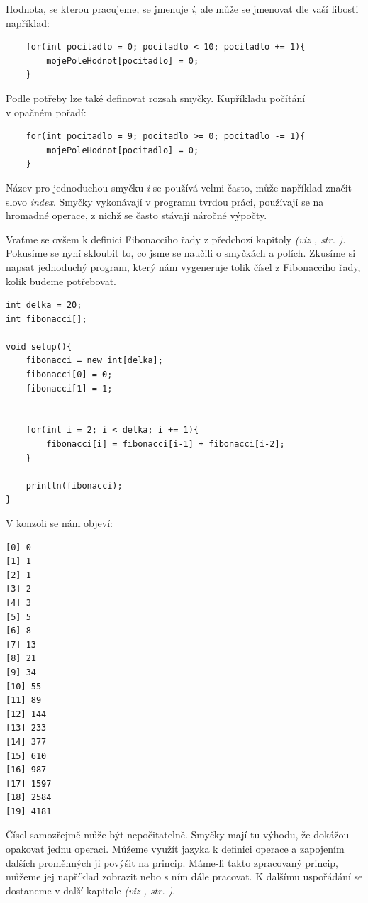 \documentclass[10pt,twoside=true,open=right,cleardoublepage=empty,chapterprefix=true]{scrbook}
\newcommand{\odkaz}[1]{\textit{(viz \nameref{#1}, str. \pageref*{#1})}}
\begin{document}
Hodnota, se kterou pracujeme, se jmenuje {\em i}, ale může se jmenovat dle vaší libosti například:

\begin{lstlisting}
	for(int pocitadlo = 0; pocitadlo < 10; pocitadlo += 1){
		mojePoleHodnot[pocitadlo] = 0;
	}
\end{lstlisting}

Podle potřeby lze také definovat rozsah smyčky. Kupříkladu počítání \\v opačném pořadí:


\begin{lstlisting}
	for(int pocitadlo = 9; pocitadlo >= 0; pocitadlo -= 1){
		mojePoleHodnot[pocitadlo] = 0;
	}
\end{lstlisting}

Název pro jednoduchou smyčku {\em i} se používá velmi často, může například značit slovo {\em index}. Smyčky vykonávají v programu tvrdou práci, používají se na hromadné operace, z nichž se často stávají náročné výpočty.

Vraťme se ovšem k definici Fibonacciho řady z předchozí kapitoly \odkaz{Pole}. Pokusíme se nyní skloubit to, co jsme se naučili o smyčkách a polích. Zkusíme si napsat jednoduchý program, který nám vygeneruje tolik čísel z Fibonacciho řady, kolik budeme potřebovat.


\begin{lstlisting}
int delka = 20;
int fibonacci[];

void setup(){
	fibonacci = new int[delka];
	fibonacci[0] = 0;
	fibonacci[1] = 1;
	
	
	for(int i = 2; i < delka; i += 1){
		fibonacci[i] = fibonacci[i-1] + fibonacci[i-2];
	}
	
	println(fibonacci);
}

\end{lstlisting}

V konzoli se nám objeví:

\begin{lstlisting}
[0] 0
[1] 1
[2] 1
[3] 2
[4] 3
[5] 5
[6] 8
[7] 13
[8] 21
[9] 34
[10] 55
[11] 89
[12] 144
[13] 233
[14] 377
[15] 610
[16] 987
[17] 1597
[18] 2584
[19] 4181
\end{lstlisting}

Čísel samozřejmě může být nepočitatelně. Smyčky mají tu výhodu, že dokážou opakovat jednu operaci. Můžeme využít jazyka k definici operace a zapojením dalších proměnných ji povýšit na princip. Máme-li takto zpracovaný princip, můžeme jej například zobrazit nebo s ním dále pracovat. K dalšímu uspořádání se dostaneme v další kapitole \odkaz{Funkce}.
\end{document}
